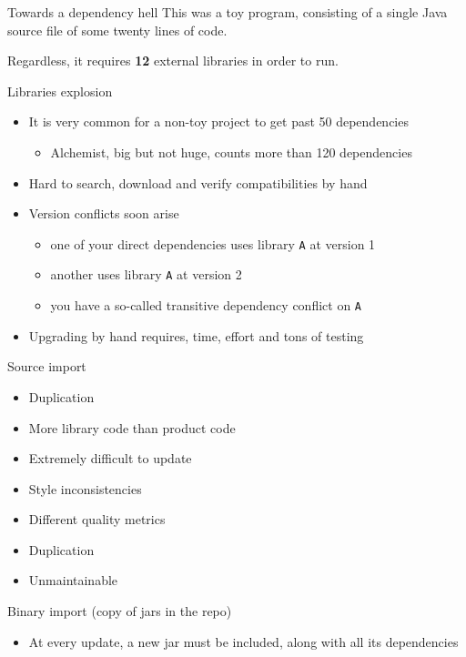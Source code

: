 \documentclass[presentation]{beamer}
\begin{document}
\begin{frame}{Towards a dependency hell}
	This was a toy program, consisting of a single Java source file of some twenty lines of code.

	Regardless, it requires \textbf{12} external libraries in order to run.
	
	\begin{block}{Libraries explosion}
		\begin{itemize}
			\item It is very common for a non-toy project to get past 50 dependencies
			\begin{itemize}
				\item Alchemist, big but not huge, counts more than 120 dependencies
			\end{itemize}
			\item Hard to search, download and verify compatibilities by hand 
			\item Version conflicts soon arise
			\begin{itemize}
				\item one of your direct dependencies uses library \texttt{A} at version 1
				\item another uses library \texttt{A} at version 2
				\item you have a so-called transitive dependency conflict on \texttt{A}
			\end{itemize}
			\item Upgrading by hand requires, time, effort and tons of testing
		\end{itemize}
	\end{block}
	\begin{block}{Source import}
		\begin{itemize}
			\item Duplication
			\item More library code than product code
			\item Extremely difficult to update
			\item Style inconsistencies
			\item Different quality metrics
			\item Duplication
			\item Unmaintainable
		\end{itemize}
	\end{block}
	\begin{block}{Binary import (copy of jars in the repo)}
		\begin{itemize}
			\item At every update, a new jar must be included, along with all its dependencies

\end{itemize}
\end{block}
\end{frame}
\end{document}
